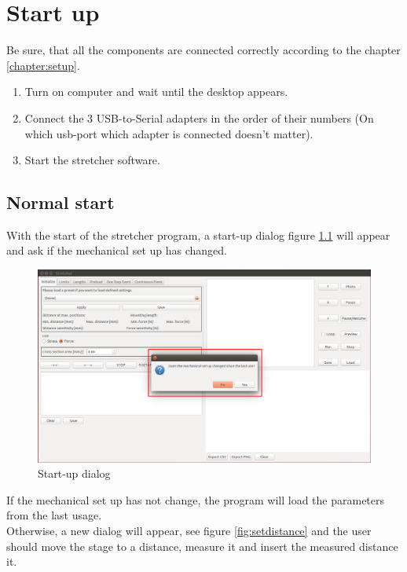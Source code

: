 \chapter{Start up}
Be sure, that all the components are connected correctly according to the chapter \ref{chapter:setup}.

\begin{enumerate}
	\item Turn on computer and wait until the desktop appears.
	\item Connect the 3 USB-to-Serial adapters in the order of their numbers (On which usb-port which adapter is connected doesn't matter).
	\item Start the stretcher software.
\end{enumerate}

\section{Normal start}
\label{sec:normalstart}
With the start of the stretcher program, a start-up dialog figure \ref{fig:startup} will appear and ask if the mechanical set up has changed.

\begin{figure}[!ht]
	\centering
		\includegraphics[width=1.0\textwidth]{images/StartUp1}
	\caption{Start-up dialog}
	\label{fig:startup}
\end{figure}

If the mechanical set up has not change, the program will load the parameters from the last usage.
\\
Otherwise, a new dialog will appear, see figure \ref{fig:setdistance} and the user should move the stage to a distance, measure it and insert the measured distance it.

